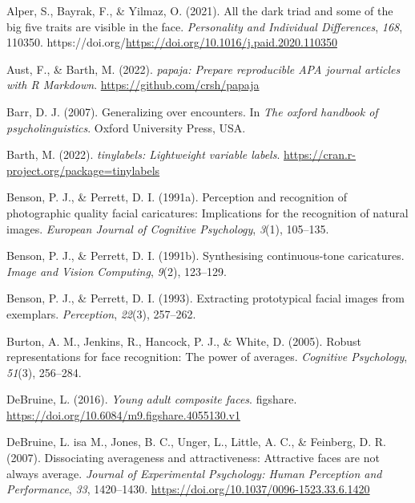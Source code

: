 \documentclass[
  doc,floatsintext]{apa6}
\newlength{\cslhangindent}
\newlength{\cslentryspacingunit} %
\newenvironment{CSLReferences}[2] %
 {%
  \setlength{\parindent}{0pt}
  \ifodd #1
  \let\oldpar\par
  \def\par{\hangindent=\cslhangindent\oldpar}
  \fi
  \setlength{\parskip}{#2\cslentryspacingunit}
 }%
 {}
\begin{document}
\hypertarget{refs}{}
\begin{CSLReferences}{1}{0}
\leavevmode{}%
Alper, S., Bayrak, F., \& Yilmaz, O. (2021). All the dark triad and some of the big five traits are visible in the face. \emph{Personality and Individual Differences}, \emph{168}, 110350. https://doi.org/\url{https://doi.org/10.1016/j.paid.2020.110350}

\leavevmode{}%
Aust, F., \& Barth, M. (2022). \emph{{papaja}: {Prepare} reproducible {APA} journal articles with {R Markdown}}. \url{https://github.com/crsh/papaja}

\leavevmode{}%
Barr, D. J. (2007). Generalizing over encounters. In \emph{The oxford handbook of psycholinguistics}. Oxford University Press, USA.

\leavevmode{}%
Barth, M. (2022). \emph{{tinylabels}: Lightweight variable labels}. \url{https://cran.r-project.org/package=tinylabels}

\leavevmode{}%
Benson, P. J., \& Perrett, D. I. (1991a). Perception and recognition of photographic quality facial caricatures: Implications for the recognition of natural images. \emph{European Journal of Cognitive Psychology}, \emph{3}(1), 105--135.

\leavevmode{}%
Benson, P. J., \& Perrett, D. I. (1991b). Synthesising continuous-tone caricatures. \emph{Image and Vision Computing}, \emph{9}(2), 123--129.

\leavevmode{}%
Benson, P. J., \& Perrett, D. I. (1993). Extracting prototypical facial images from exemplars. \emph{Perception}, \emph{22}(3), 257--262.

\leavevmode{}%
Burton, A. M., Jenkins, R., Hancock, P. J., \& White, D. (2005). Robust representations for face recognition: The power of averages. \emph{Cognitive Psychology}, \emph{51}(3), 256--284.

\leavevmode{}%
DeBruine, L. (2016). \emph{Young adult composite faces}. figshare. \url{https://doi.org/10.6084/m9.figshare.4055130.v1}

\leavevmode{}%
DeBruine, L. isa M., Jones, B. C., Unger, L., Little, A. C., \& Feinberg, D. R. (2007). Dissociating averageness and attractiveness: Attractive faces are not always average. \emph{Journal of Experimental Psychology: Human Perception and Performance}, \emph{33}, 1420--1430. \url{https://doi.org/10.1037/0096-1523.33.6.1420}


\end{CSLReferences}
\end{document}

